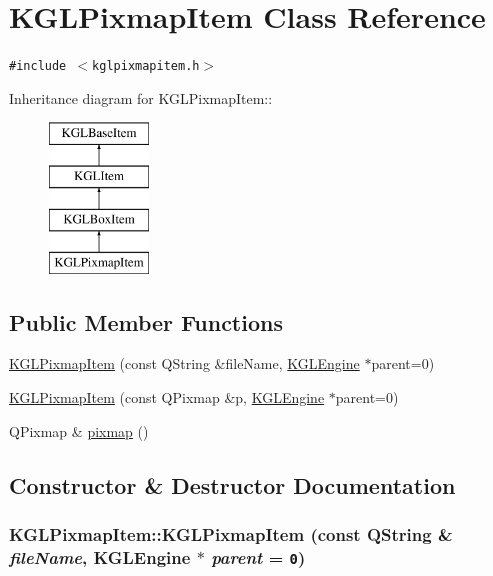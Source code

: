 \hypertarget{class_k_g_l_pixmap_item}{
\section{KGLPixmapItem Class Reference}
\label{class_k_g_l_pixmap_item}
}
{\tt \#include $<$kglpixmapitem.h$>$}

Inheritance diagram for KGLPixmapItem::\begin{figure}[H]
\begin{center}
\leavevmode
\includegraphics[height=4cm]{class_k_g_l_pixmap_item}
\end{center}
\end{figure}
\subsection*{Public Member Functions}
\begin{CompactItemize}
\item 
\hyperlink{class_k_g_l_pixmap_item_7f12bfbc0c6fe5f89363dae5c800b476}{KGLPixmapItem} (const QString \&fileName, \hyperlink{class_k_g_l_engine}{KGLEngine} $\ast$parent=0)
\item 
\hyperlink{class_k_g_l_pixmap_item_8fe07e2180e081aa135b613388377e70}{KGLPixmapItem} (const QPixmap \&p, \hyperlink{class_k_g_l_engine}{KGLEngine} $\ast$parent=0)
\item 
QPixmap \& \hyperlink{class_k_g_l_pixmap_item_5f5bdbb102070403f1fdbd046b4e0a61}{pixmap} ()
\end{CompactItemize}


\subsection{Constructor \& Destructor Documentation}
\hypertarget{class_k_g_l_pixmap_item_7f12bfbc0c6fe5f89363dae5c800b476}{
\subsubsection[{KGLPixmapItem}]{\setlength{\rightskip}{0pt plus 5cm}KGLPixmapItem::KGLPixmapItem (const QString \& {\em fileName}, \/  {\bf KGLEngine} $\ast$ {\em parent} = {\tt 0})}}
\label{class_k_g_l_pixmap_item_7f12bfbc0c6fe5f89363dae5c800b476}


